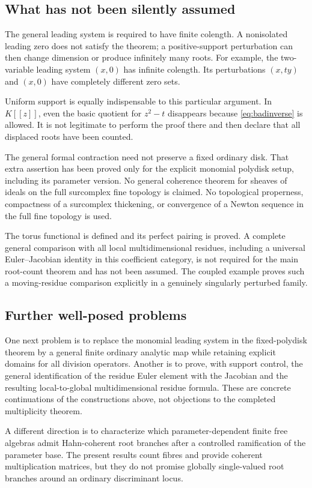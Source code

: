 \documentclass[11pt,letterpaper]{article}
\theoremstyle{definition}
\theoremstyle{remark}
\numberwithin{equation}{section}
\begin{document}
\subsection{What has not been silently assumed}
The general leading system is required to have finite colength. A nonisolated leading zero does not satisfy the theorem; a positive-support perturbation can then change dimension or produce infinitely many roots. For example, the two-variable leading system $(x,0)$ has infinite colength. Its perturbations $(x,ty)$ and $(x,0)$ have completely different zero sets.

Uniform support is equally indispensable to this particular argument. In $K[[z]]$, even the basic quotient for $z^2-t$ disappears because \eqref{eq:badinverse} is allowed. It is not legitimate to perform the proof there and then declare that all displaced roots have been counted.

The general formal contraction need not preserve a fixed ordinary disk. That extra assertion has been proved only for the explicit monomial polydisk setup, including its parameter version. No general coherence theorem for sheaves of ideals on the full surcomplex fine topology is claimed. No topological properness, compactness of a surcomplex thickening, or convergence of a Newton sequence in the full fine topology is used.

The torus functional is defined and its perfect pairing is proved. A complete general comparison with all local multidimensional residues, including a universal Euler--Jacobian identity in this coefficient category, is not required for the main root-count theorem and has not been assumed. The coupled example proves such a moving-residue comparison explicitly in a genuinely singularly perturbed family.

\subsection{Further well-posed problems}
One next problem is to replace the monomial leading system in the fixed-polydisk theorem by a general finite ordinary analytic map while retaining explicit domains for all division operators. Another is to prove, with support control, the general identification of the residue Euler element with the Jacobian and the resulting local-to-global multidimensional residue formula. These are concrete continuations of the constructions above, not objections to the completed multiplicity theorem.

A different direction is to characterize which parameter-dependent finite free algebras admit Hahn-coherent root branches after a controlled ramification of the parameter base. The present results count fibres and provide coherent multiplication matrices, but they do not promise globally single-valued root branches around an ordinary discriminant locus.
\end{document}
